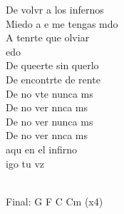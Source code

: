 \documentclass[12pt]{article}
\begin{document}
\begin{multicols*}{2}
\begin{cancion}[Miedo][M Clan]
\begin{chorus}
                De volvr a los infernos\\
                Miedo a e me tengas mdo\\
                A tenrte que olviar     \\
                edo\\
                De queerte sin querlo\\
                De encontrte de rente\\
                De no vte nunca ms         \\
                De no ver nnca ms         \\
                De no ver nunca ms\\
                De no ver nnca ms             \\
        \jump
                 aqu en el infirno  \\
                  igo tu vz    \\
                \end{chorus}%
                \jump\\
        Final:  G  F  C  Cm (x4)\\
        \end{cancion}%

        \newpage
        

\end{multicols*}
\end{document}
